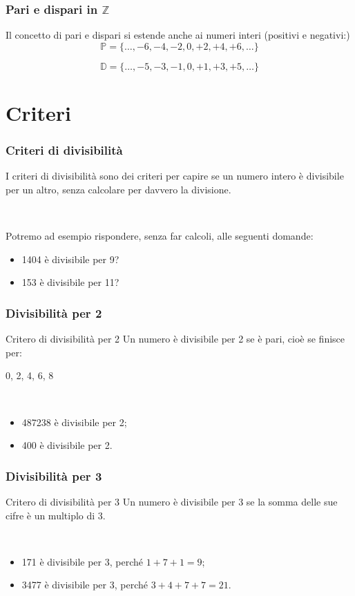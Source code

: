 \documentclass[]{beamer}
\theoremstyle{plain}
\begin{document}
\begin{frame}
\frametitle{Pari e dispari in $\mathbb{Z}$}
Il concetto di pari e dispari si estende anche ai numeri interi (positivi e negativi:)
\[ \mathbb{P} = \{ \ldots, -6, -4, -2, 0, +2, +4, +6, \ldots \} \]\pause

\[ \mathbb{D} = \{ \ldots, -5, -3, -1, 0, +1, +3, +5, \ldots \} \]\pause
\end{frame}


\section{Criteri}

\begin{frame}
\frametitle{Criteri di divisibilità}
I criteri di divisibilità sono dei \alert{criteri} per capire se un numero intero è divisibile per un altro, senza calcolare per davvero la divisione.\pause

~

Potremo ad esempio rispondere, senza far calcoli, alle seguenti domande:
\begin{itemize}
  \item 1404 è divisibile per 9?\pause
  \item 153 è divisibile per 11?
\end{itemize}
\end{frame}


\begin{frame}
\frametitle{Divisibilità per 2}
\begin{block}{Critero di divisibilità per 2}
  Un numero è divisibile per 2 se è pari, cioè se finisce per:
  \begin{center}
    0, 2, 4, 6, 8
  \end{center}
\end{block}\pause

~

\begin{itemize}
  \item 487238 è divisibile per 2;\pause
  \item 400 è divisibile per 2.
\end{itemize}
\end{frame}



\begin{frame}
\frametitle{Divisibilità per 3}
\begin{block}{Critero di divisibilità per 3}
  Un numero è divisibile per 3 se la somma delle sue cifre è un multiplo di 3.
\end{block}\pause

~

\begin{itemize}
  \item 171 è divisibile per 3, perché $ 1+ 7+ 1 = 9 $;\pause
  \item 3477 è divisibile per 3, perché $ 3 + 4+ 7+ 7 = 21 $.
\end{itemize}
\end{frame}
\end{document}
